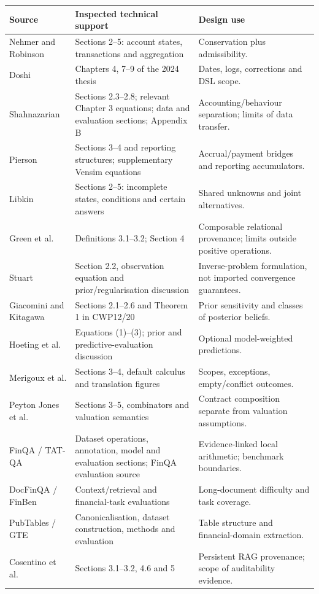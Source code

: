 \begin{longtable}{L{33mm}L{57mm}L{46mm}}
\toprule Source & Inspected technical support & Design use\\\midrule\endhead
Nehmer and Robinson & Sections 2--5: account states, transactions and aggregation &
Conservation plus admissibility.\\
Doshi & Chapters 4, 7--9 of the 2024 thesis & Dates, logs, corrections and DSL scope.\\
Shahnazarian & Sections 2.3--2.8; relevant Chapter 3 equations; data and evaluation
sections; Appendix B & Accounting/behaviour separation; limits of data transfer.\\
Pierson & Sections 3--4 and reporting structures; supplementary Vensim equations &
Accrual/payment bridges and reporting accumulators.\\
Libkin & Sections 2--5: incomplete states, conditions and certain answers &
Shared unknowns and joint alternatives.\\
Green et al. & Definitions 3.1--3.2; Section 4 & Composable relational provenance;
limits outside positive operations.\\
Stuart & Section 2.2, observation equation and prior/regularisation discussion &
Inverse-problem formulation, not imported convergence guarantees.\\
Giacomini and Kitagawa & Sections 2.1--2.6 and Theorem 1 in CWP12/20 &
Prior sensitivity and classes of posterior beliefs.\\
Hoeting et al. & Equations (1)--(3); prior and predictive-evaluation discussion &
Optional model-weighted predictions.\\
Merigoux et al. & Sections 3--4, default calculus and translation figures &
Scopes, exceptions, empty/conflict outcomes.\\
Peyton Jones et al. & Sections 3--5, combinators and valuation semantics &
Contract composition separate from valuation assumptions.\\
FinQA / TAT-QA & Dataset operations, annotation, model and evaluation sections;
FinQA evaluation source & Evidence-linked local arithmetic; benchmark boundaries.\\
DocFinQA / FinBen & Context/retrieval and financial-task evaluations &
Long-document difficulty and task coverage.\\
PubTables / GTE & Canonicalisation, dataset construction, methods and evaluation &
Table structure and financial-domain extraction.\\
Cosentino et al. & Sections 3.1--3.2, 4.6 and 5 & Persistent RAG provenance;
scope of auditability evidence.\\\bottomrule
\end{longtable}

